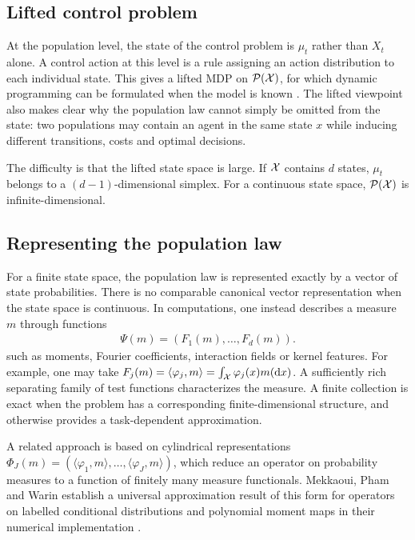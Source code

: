 \subsection{Lifted control problem}

At the population level, the state of the control problem is $\mu_t$ rather than $X_t$ alone. A control action at this level is a rule assigning an action distribution to each individual state. This gives a lifted MDP on ${\cal P}({\cal X})$, for which dynamic programming can be formulated when the model is known \cite{motte2022mean}. The lifted viewpoint also makes clear why the population law cannot simply be omitted from the state: two populations may contain an agent in the same state $x$ while inducing different transitions, costs and optimal decisions.

The difficulty is that the lifted state space is large. If ${\cal X}$ contains $d$ states, $\mu_t$ belongs to a $(d-1)$-dimensional simplex. For a continuous state space, ${\cal P}({\cal X})$ is infinite-dimensional.

\subsection{Representing the population law}

For a finite state space, the population law is represented exactly by a vector of state probabilities. There is no comparable canonical vector representation when the state space is continuous. In computations, one instead describes a measure $m$ through functions
\begin{align}
    \label{eq:background-measure_representation}
    \Psi(m) = \left(F_1(m),\ldots,F_d(m)\right).
\end{align}
such as moments, Fourier coefficients, interaction fields or kernel features. For example, one may take $F_j(m)=\langle\varphi_j,m\rangle=\int_{\cal X}\varphi_j(x)m(\mathrm{d} x)$. A sufficiently rich separating family of test functions characterizes the measure. A finite collection is exact when the problem has a corresponding finite-dimensional structure, and otherwise provides a task-dependent approximation.

A related approach is based on cylindrical representations $\Phi_J(m) = \left(\langle\varphi_1,m\rangle,\ldots,\langle\varphi_J,m\rangle \right)$,
which reduce an operator on probability measures to a function of finitely many measure functionals. Mekkaoui, Pham and Warin establish a universal approximation result of this form for operators on labelled conditional distributions and polynomial moment maps in their numerical implementation \cite{LO}.

